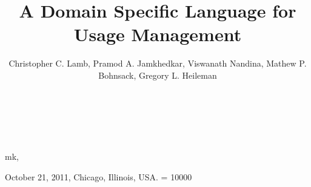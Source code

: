 \documentclass{acm_proc_article-sp}
\begin{document}
\title{A Domain Specific Language for Usage Management}

mk,
\author{
\alignauthor
Christopher C. Lamb, Pramod A. Jamkhedkar, Viswanath Nandina, Mathew P. Bohnsack, Gregory L. Heileman \\
       \\
       \\
       \\
}

 {October 21, 2011, Chicago, Illinois, USA.} 
\widowpenalty = 10000

\maketitle









\end{document}
